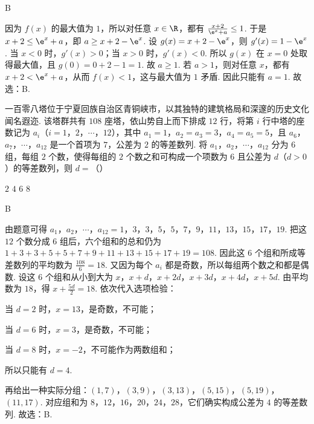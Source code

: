 \documentclass[UTF8,a4paper,oneside,11pt]{ctexbook}
\begin{document}
\begin{answer}
B
\end{answer}

\begin{solution}
因为 \(f(x)\) 的最大值为 \(1\)，所以对任意 \(x\in\R\)，都有 \(\frac{x+2}{\e^x+a}\le 1\). 于是 \(x+2\le \e^x+a\)，即 \(a\ge x+2-\e^x\). 设 \(g(x)=x+2-\e^x\)，则 \(g'(x)=1-\e^x\). 当 \(x<0\) 时，\(g'(x)>0\)；当 \(x>0\) 时，\(g'(x)<0\). 所以 \(g(x)\) 在 \(x=0\) 处取得最大值，且 \(g(0)=0+2-1=1\). 故 \(a\ge 1\).
若 \(a>1\)，则对任意 \(x\)，都有 \(x+2<\e^x+a\)，从而 \(f(x)<1\)，这与最大值为 \(1\) 矛盾. 因此只能有 \(a=1\). 故选：B.
\end{solution}

\begin{problem}
一百零八塔位于宁夏回族自治区青铜峡市，以其独特的建筑格局和深邃的历史文化闻名遐迩. 该塔群共有 \(108\) 座塔，依山势自上而下排成 \(12\) 行，将第 \(i\) 行中塔的座数记为 \(a_i\)（\(i=1\)，\(2\)，\(\cdots\)，\(12\)），其中 \(a_1=1\)，\(a_2=a_3=3\)，\(a_4=a_5=5\)，且 \(a_6\)，\(a_7\)，\(\cdots\)，\(a_{12}\) 是一个首项为 \(7\)，公差为 \(2\) 的等差数列. 将 \(a_1\)，\(a_2\)，\(\cdots\)，\(a_{12}\) 分为 \(6\) 组，每组 \(2\) 个数，使得每组的 \(2\) 个数之和可构成一个项数为 \(6\) 且公差为 \(d\)（\(d>0\)）的等差数列，则 \(d=\)（\quad）

\choices
    {\(2\)}
    {\(4\)}
    {\(6\)}
    {\(8\)}
\end{problem}

\begin{answer}
B
\end{answer}

\begin{solution}
由题意可得 \(a_1\)，\(a_2\)，\(\cdots\)，\(a_{12}=1\)，\(3\)，\(3\)，\(5\)，\(5\)，\(7\)，\(9\)，\(11\)，\(13\)，\(15\)，\(17\)，\(19\). 把这 \(12\) 个数分成 \(6\) 组后，六个组和的总和仍为 \(1+3+3+5+5+7+9+11+13+15+17+19=108\). 因此这 \(6\) 个组和所成等差数列的平均数为 \(\frac{108}{6}=18\).
又因为每个 \(a_i\) 都是奇数，所以每组两个数之和都是偶数. 设这 \(6\) 个组和从小到大为 \(x\)，\(x+d\)，\(x+2d\)，\(x+3d\)，\(x+4d\)，\(x+5d\). 由平均数为 \(18\)，得 \(x+\frac{5d}{2}=18\).
依次代入选项检验：

当 \(d=2\) 时，\(x=13\)，是奇数，不可能；

当 \(d=6\) 时，\(x=3\)，是奇数，不可能；

当 \(d=8\) 时，\(x=-2\)，不可能作为两数组和；

所以只能有 \(d=4\).

再给出一种实际分组：\(\left( 1,7 \right)\)，\(\left( 3,9 \right)\)，\(\left( 3,13 \right)\)，\(\left( 5,15 \right)\)，\(\left( 5,19 \right)\)，\(\left( 11,17 \right)\). 对应组和为 \(8\)，\(12\)，\(16\)，\(20\)，\(24\)，\(28\)，它们确实构成公差为 \(4\) 的等差数列. 故选：B.
\end{solution}
\end{document}
